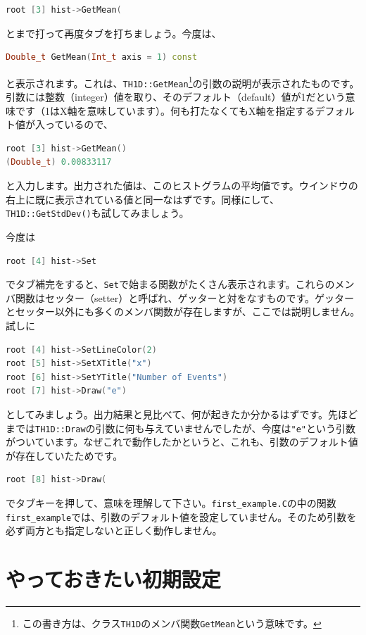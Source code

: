 {\begin{lstlisting}[language=c++]
root [3] hist->GetMean(
\end{lstlisting}
とまで打って再度タブを打ちましょう。今度は、
\begin{lstlisting}[language=c++]
Double_t GetMean(Int_t axis = 1) const
\end{lstlisting}
と表示されます。これは、\texttt{TH1D::GetMean}\footnote{この書き方は、クラス\texttt{TH1D}のメンバ関数\texttt{GetMean}という意味です。}の引数の説明が表示されたものです。引数には整数（integer）値を取り、そのデフォルト（default）値が1だという意味です（1はX軸を意味しています）。何も打たなくてもX軸を指定するデフォルト値が入っているので、
\begin{lstlisting}[language=c++]
root [3] hist->GetMean()
(Double_t) 0.00833117
\end{lstlisting}
と入力します。出力された値は、このヒストグラムの平均値です。ウインドウの右上に既に表示されている値と同一なはずです。同様にして、\texttt{TH1D::GetStdDev()}も試してみましょう。

今度は
\begin{lstlisting}[language=c++]
root [4] hist->Set
\end{lstlisting}
でタブ補完をすると、\texttt{Set}で始まる関数がたくさん表示されます。これらのメンバ関数はセッター（setter）と呼ばれ、ゲッターと対をなすものです。ゲッターとセッター以外にも多くのメンバ関数が存在しますが、ここでは説明しません。試しに
\begin{lstlisting}[language=c++]
root [4] hist->SetLineColor(2)
root [5] hist->SetXTitle("x")
root [6] hist->SetYTitle("Number of Events")
root [7] hist->Draw("e")
\end{lstlisting}
としてみましょう。出力結果と見比べて、何が起きたか分かるはずです。先ほどまでは\texttt{TH1D::Draw}の引数に何も与えていませんでしたが、今度は\texttt{"e"}という引数がついています。なぜこれで動作したかというと、これも、引数のデフォルト値が存在していたためです。
\begin{lstlisting}[language=c++]
root [8] hist->Draw(
\end{lstlisting}
でタブキーを押して、意味を理解して下さい。\texttt{first\_example.C}の中の関数\texttt{first\_example}では、引数のデフォルト値を設定していません。そのため引数を必ず両方とも指定しないと正しく動作しません。

\section{やっておきたい初期設定}

}
